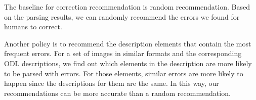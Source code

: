 The baseline for correction recommendation is random 
recommendation. Based on the parsing results, we can randomly 
recommend the errors we found for humans to correct.  

Another policy is to recommend the description 
elements that contain the most frequent errors. For a set of images 
in similar formats and the corresponding ODL descriptions, 
we find out which elements in the description are more likely 
to be parsed with errors. For those elements, similar errors 
are more likely to happen since the descriptions for them are the 
same. In this way, our recommendations can be more 
accurate than a random recommendation. 

